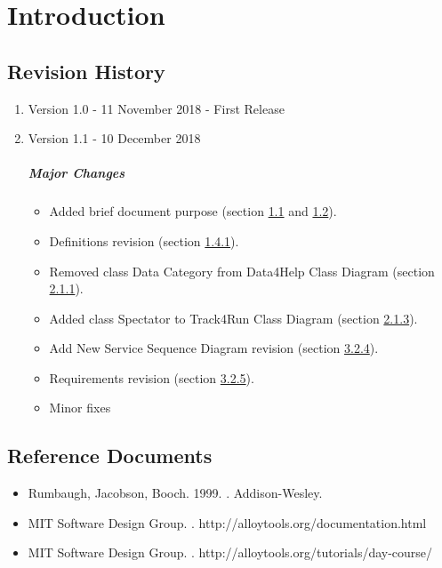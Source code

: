\documentclass[../rasd.tex]{subfiles}
\begin{document}
\chapter{Introduction}
\thispagestyle{fancy}
		
		
		
		
		
	
		\section{Revision History}
		\begin{enumerate}
			\item Version 1.0 - 11 November 2018 - First Release
			\item Version 1.1 - 10 December 2018
				\paragraph{Major Changes}
				\begin{itemize}
					\item Added brief document purpose (section \hyperref[sect:1.1]{1.1} and \hyperref[sect:1.2]{1.2}).
					\item Definitions revision (section \hyperref[sect:1.4.1]{1.4.1}).
					\item Removed class Data Category from Data4Help Class Diagram (section \hyperref[sect:2.1.1]{2.1.1}).
					\item Added class Spectator to Track4Run Class Diagram (section \hyperref[sect:2.1.3]{2.1.3}).
					\item Add New Service Sequence Diagram revision (section \hyperref[sect:3.2.4]{3.2.4}).
					\item Requirements revision (section \hyperref[sect:3.2.5]{3.2.5}).
					\item Minor fixes
				\end{itemize}

		\end{enumerate}
		\section{Reference Documents}
			\begin{itemize}
				\item Rumbaugh, Jacobson, Booch. 1999. . Addison-Wesley.
				\item MIT Software Design Group. . http://alloytools.org/documentation.html
				\item MIT Software Design Group. . http://alloytools.org/tutorials/day-course/
			\end{itemize}
\end{document}
